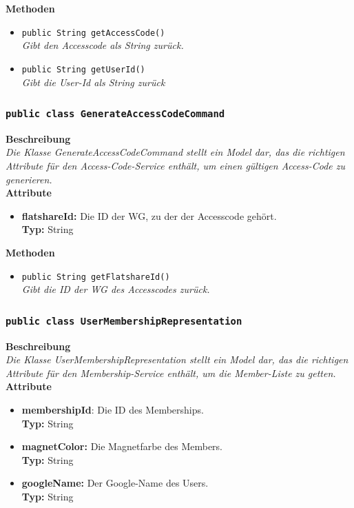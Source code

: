 \documentclass[a4paper]{scrreprt}
\begin{document}
	\textbf{Methoden}
	\begin{itemize}
		\item{\texttt{public String getAccessCode()}}\\
		\textit{Gibt den Accesscode als String zurück.}\\
		\item{\texttt{public String getUserId()}}\\
		\textit{Gibt die User-Id als String zurück}\\
	\end{itemize}
	\subsubsection{\texttt{public class GenerateAccessCodeCommand}}
	\textbf{Beschreibung} \\
	\textit{Die Klasse GenerateAccessCodeCommand stellt ein Model dar, das die richtigen Attribute für den Access-Code-Service enthält, um einen gültigen Access-Code zu generieren.} \\
	
	\textbf{Attribute}
	\begin{itemize}
		\item \textbf{flatshareId:} Die ID der WG, zu der der Accesscode gehört. \\
		\textbf{Typ:} String
	\end{itemize}
	
	\textbf{Methoden}
	\begin{itemize}
		\item{\texttt{public String getFlatshareId()}}\\
		\textit{Gibt die ID der WG des Accesscodes zurück.}\\
	\end{itemize}
	\subsubsection{\texttt{public class UserMembershipRepresentation}}
	\textbf{Beschreibung} \\
	\textit{Die Klasse UserMembershipRepresentation stellt ein Model dar, das die richtigen Attribute für den Membership-Service enthält, um die Member-Liste zu getten.} \\
	
	\textbf{Attribute}
	\begin{itemize}
		\item \textbf{membershipId}: Die ID des Memberships. \\
		\textbf{Typ:} String
		
		\item \textbf{magnetColor:} Die Magnetfarbe des Members. \\
		\textbf{Typ:} String
		
		\item \textbf{googleName:} Der Google-Name des Users.\\
		\textbf{Typ:} String
	\end{itemize}
	
\end{document}
